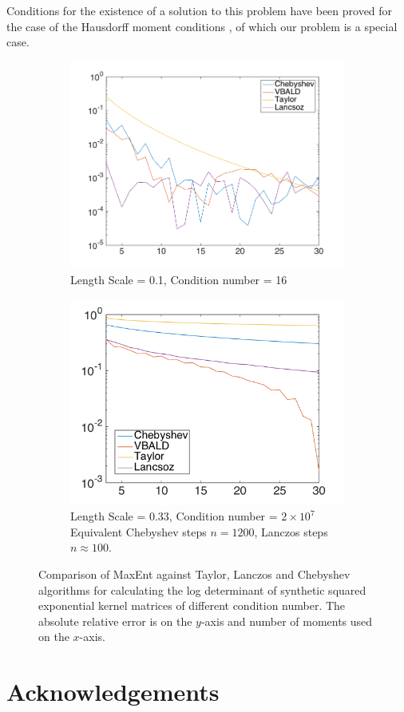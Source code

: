 \documentclass[letterpaper]{article} %
\begin{document}
Conditions for the existence of a solution to this problem have been proved for the case of the Hausdorff moment conditions \cite{mead1984maximum}, of which our problem is a special case.

\begin{figure}
	\begin{subfigure}%
		\centering
		\includegraphics[width=1\linewidth]{propercond30dim0p1}
		\caption{Length Scale = 0.1, Condition number = 16}
		\label{fig:lscale0.1}
	\end{subfigure}
	\begin{subfigure}%
		\centering
		\includegraphics[width=1\linewidth]{69500756condl0p33}
		\caption{Length Scale = 0.33, Condition number = $2\times 10^{7}$ Equivalent Chebyshev steps $n=1200$, Lanczos steps $n\approx 100$.}
		\label{fig:lscale0.33}
	\end{subfigure}
	\caption{Comparison of MaxEnt against Taylor, Lanczos and Chebyshev algorithms for calculating the log determinant of synthetic squared exponential kernel matrices of different condition number. The absolute relative error is on the $y$-axis and number of moments used on the $x$-axis.}
\end{figure}

\section*{Acknowledgements}







\end{document}
